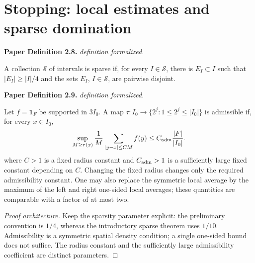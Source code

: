 \section{Stopping: local estimates and sparse domination}

\begin{definition}
\label{SparseData}
\uses{}
\leanok
\par\medskip\noindent\textbf{Paper Definition 2.8.} \textit{definition formalized.}\par
A collection $\mathcal S$ of intervals is sparse if, for every
$I\in\mathcal S$, there is $E_I\subset I$ such that
$|E_I|\geq|I|/4$ and the sets $E_I$, $I\in\mathcal S$, are pairwise
disjoint.
\par\medskip\noindent\textbf{Paper Definition 2.9.} \textit{definition formalized.}\par
Let $f=\mathbf1_F$ be supported in $3I_0$.  A map $\tau:I_0\longrightarrow\{2^j:1\leq2^j\leq|I_0|\}$
is admissible if, for every $x\in I_0$,
\begin{align}
 \sup_{M\geq\tau(x)}\frac1M
 \sum_{|y-x|\leq CM}f(y)
 \leq C_{\rm adm}\frac{|F|}{|I_0|}.
\end{align}
where $C>1$ is a fixed radius constant and $C_{\rm adm}>1$ is a
sufficiently large fixed constant depending on $C$.
Changing the fixed radius changes only the required admissibility
constant. One may also replace the symmetric local average by the
maximum of the left and right one-sided local averages; these
quantities are comparable with a factor of at most two.
\end{definition}
\begin{proof}[Proof architecture]
\uses{}
\leanok
Keep the sparsity parameter explicit: the preliminary convention is $1/4$, whereas the introductory sparse theorem uses $1/10$. Admissibility is a symmetric spatial density condition; a single one-sided bound does not suffice. The radius constant and the sufficiently large admissibility coefficient are distinct parameters.
\end{proof}

